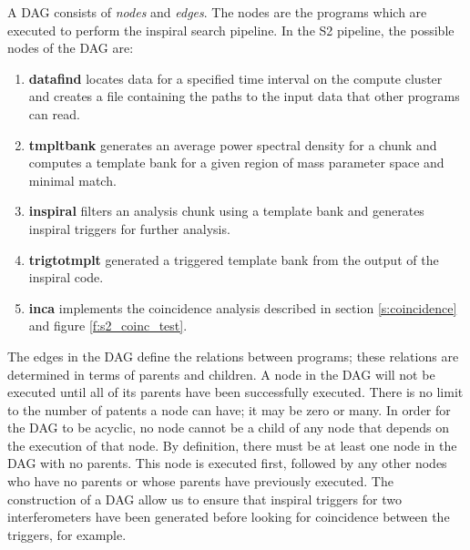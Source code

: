 A DAG consists of \emph{nodes} and \emph{edges}. The nodes are the programs
which are executed to perform the inspiral search pipeline. In the S2
pipeline, the possible nodes of the DAG are:
\begin{enumerate}
\item \textbf{datafind} locates data for a specified time interval on the compute
cluster and creates a file containing the paths to the input data that other
programs can read.

\item\textbf{tmpltbank} generates an average power spectral density for a chunk and
computes a template bank for a given region of mass parameter space and
minimal match.

\item\textbf{inspiral} filters an analysis chunk using a template bank and generates 
inspiral triggers for further analysis.

\item\textbf{trigtotmplt} generated a triggered template bank from the output of the
inspiral code.

\item\textbf{inca} implements the coincidence analysis described in section
\ref{s:coincidence} and figure \ref{f:s2_coinc_test}.
\end{enumerate}
The edges in the DAG define the relations between programs; these relations
are determined in terms of parents and children. A node in the DAG will not be
executed until all of its parents have been successfully executed. There is no
limit to the number of patents a node can have; it may be zero or many. In
order for the DAG to be acyclic, no node cannot be a child of any node that
depends on the execution of that node. By definition, there must be at least
one node in the DAG with no parents. This node is executed first, followed by
any other nodes who have no parents or whose parents have previously executed.
The construction of a DAG allow us to ensure that inspiral triggers for two
interferometers have been generated before looking for coincidence between
the triggers, for example.

